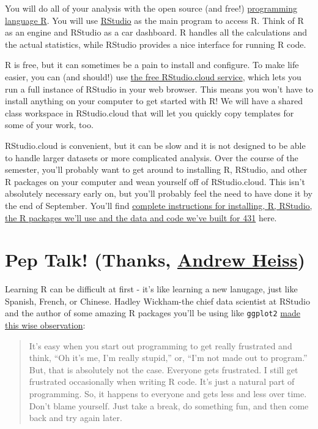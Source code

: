 \documentclass[
]{book}
\begin{document}
You will do all of your analysis with the open source (and free!) \href{https://cloud.r-project.org}{programming language R}. You will use \href{https://www.rstudio.com/}{RStudio} as the main program to access R. Think of R as an engine and RStudio as a car dashboard. R handles all the calculations and the actual statistics, while RStudio provides a nice interface for running R code.

R is free, but it can sometimes be a pain to install and configure. To make life easier, you can (and should!) use \href{http://rstudio.cloud/}{the free RStudio.cloud service}, which lets you run a full instance of RStudio in your web browser. This means you won't have to install anything on your computer to get started with R! We will have a shared class workspace in RStudio.cloud that will let you quickly copy templates for some of your work, too.

RStudio.cloud is convenient, but it can be slow and it is not designed to be able to handle larger datasets or more complicated analysis. Over the course of the semester, you'll probably want to get around to installing R, RStudio, and other R packages on your computer and wean yourself off of RStudio.cloud. This isn't absolutely necessary early on, but you'll probably feel the need to have done it by the end of September. You'll find \href{https://thomaselove.github.io/2019-431-syllabus/on-software-and-r.html}{complete instructions for installing, R, RStudio, the R packages we'll use and the data and code we've built for 431} here.

\hypertarget{pep-talk-thanks-andrew-heiss}{%
\section{\texorpdfstring{Pep Talk! (Thanks, \href{https://evalf19.classes.andrewheiss.com/syllabus/\#pep-talk}{Andrew Heiss})}{Pep Talk! (Thanks, Andrew Heiss)}}\label{pep-talk-thanks-andrew-heiss}}

Learning R can be difficult at first - it's like learning a new lanugage, just like Spanish, French, or Chinese. Hadley Wickham-the chief data scientist at RStudio and the author of some amazing R packages you'll be using like \texttt{ggplot2} \href{https://r-posts.com/advice-to-young-and-old-programmers-a-conversation-with-hadley-wickham/}{made this wise observation}:

\begin{quote}
It's easy when you start out programming to get really frustrated and think, ``Oh it's me, I'm really stupid,'' or, ``I'm not made out to program.'' But, that is absolutely not the case. Everyone gets frustrated. I still get frustrated occasionally when writing R code. It's just a natural part of programming. So, it happens to everyone and gets less and less over time. Don't blame yourself. Just take a break, do something fun, and then come back and try again later.
\end{quote}
\end{document}
